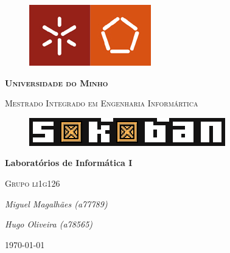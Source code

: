 \documentclass[12pt,a4paper]{report}
\newcommand{\HRule}[1]{\rule{\linewidth}{#1}}
\begin{document}
\begin{titlepage}
    \centering
    \begin{figure}[h]
    \includegraphics[scale=2]{images/logo_um_eng.jpg}
    \centering
    \end{figure}
    {\scshape\huge\bfseries {Universidade do Minho}\par}
    \vspace{0.5cm}
    {\scshape\large{Mestrado Integrado em Engenharia Informártica}\par}
    \vspace{6cm}
    \begin{figure}[h]
    \includegraphics[scale=11]{images/logo.png}
    \centering
    \end{figure}
    {\Large\bfseries Laboratórios de Informática I\par}
    \vspace{4cm}
    {\scshape\Large Grupo li1g126\par}
    \vspace{1cm}
    {\Large\itshape Miguel Magalhães (a77789)\par}
    {\Large\itshape Hugo Oliveira (a78565)\par}
    \vfill
    {\large \today\par}
\end{titlepage}

\tableofcontents
\thispagestyle{empty}
\newpage

\begin{abstract}

Este documento, desenvolvido na unidade curricular de Laboratórios de Informática 1 (LI1), apresenta uma resolução de um jogo do tipo Sokoban.\\

Um dos objetivos da resolução deste problema, é tornar o jogo diferente do típico jogo Sokoban, como tal, foi acrescentado ao jogo a possibilidade de alterar o tema, de alterar os níveis de jogo, de utilizar Undo e Restart ainda de poder visualizar o Score.\\

O relatório baseia-se, fundamentalmente, nas partes mais importantes dos códigos desenvolvidos na resolução do jogo.
Assim, este está dividido em 4 partes, sendo que as duas últimas são as mais importantes: Fase Inicial do jogo, Solver, Movimentação do Sokoban e ainda Interface Gráfica.

\end{abstract}
\end{document}
